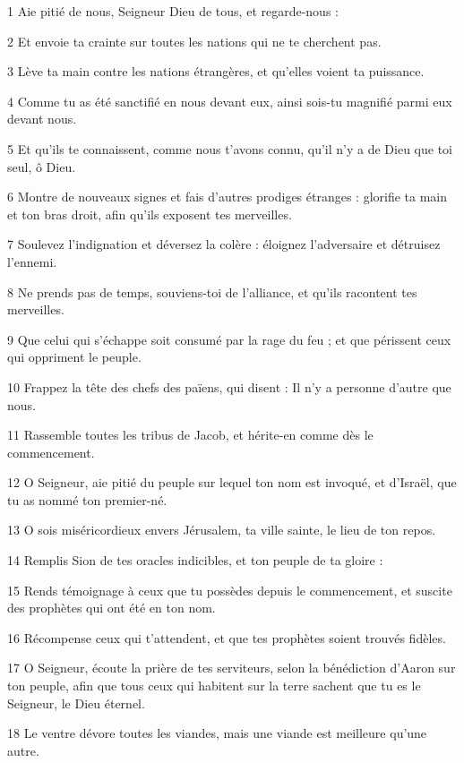 
\par 1 Aie pitié de nous, Seigneur Dieu de tous, et regarde-nous :
\par 2 Et envoie ta crainte sur toutes les nations qui ne te cherchent pas.
\par 3 Lève ta main contre les nations étrangères, et qu'elles voient ta puissance.
\par 4 Comme tu as été sanctifié en nous devant eux, ainsi sois-tu magnifié parmi eux devant nous.
\par 5 Et qu'ils te connaissent, comme nous t'avons connu, qu'il n'y a de Dieu que toi seul, ô Dieu.
\par 6 Montre de nouveaux signes et fais d'autres prodiges étranges : glorifie ta main et ton bras droit, afin qu'ils exposent tes merveilles.
\par 7 Soulevez l'indignation et déversez la colère : éloignez l'adversaire et détruisez l'ennemi.
\par 8 Ne prends pas de temps, souviens-toi de l'alliance, et qu'ils racontent tes merveilles.
\par 9 Que celui qui s'échappe soit consumé par la rage du feu ; et que périssent ceux qui oppriment le peuple.
\par 10 Frappez la tête des chefs des païens, qui disent : Il n'y a personne d'autre que nous.
\par 11 Rassemble toutes les tribus de Jacob, et hérite-en comme dès le commencement.
\par 12 O Seigneur, aie pitié du peuple sur lequel ton nom est invoqué, et d'Israël, que tu as nommé ton premier-né.
\par 13 O sois miséricordieux envers Jérusalem, ta ville sainte, le lieu de ton repos.
\par 14 Remplis Sion de tes oracles indicibles, et ton peuple de ta gloire :
\par 15 Rends témoignage à ceux que tu possèdes depuis le commencement, et suscite des prophètes qui ont été en ton nom.
\par 16 Récompense ceux qui t'attendent, et que tes prophètes soient trouvés fidèles.
\par 17 O Seigneur, écoute la prière de tes serviteurs, selon la bénédiction d'Aaron sur ton peuple, afin que tous ceux qui habitent sur la terre sachent que tu es le Seigneur, le Dieu éternel.
\par 18 Le ventre dévore toutes les viandes, mais une viande est meilleure qu'une autre.
